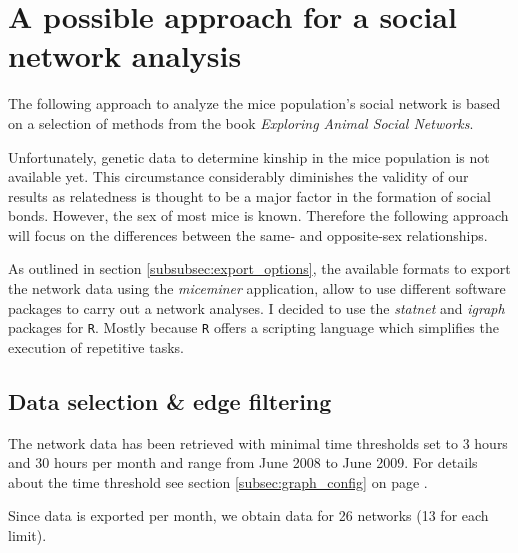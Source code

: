 \section{A possible approach for a social network analysis}
\label{sec:network_analysis}

The following approach to analyze the mice population's social network is based on a selection of methods from the book \textit{Exploring Animal Social Networks}\citep{croft:07}. 

Unfortunately, genetic data to determine kinship in the mice population is not available yet. This circumstance considerably diminishes the validity of our results as relatedness is thought to be a major factor in the formation of social bonds. However, the sex of most mice is known. Therefore the following approach will focus on the differences between the same- and opposite-sex relationships.

As outlined in section \ref{subsubsec:export_options}, the available formats to export the network data using the \textit{miceminer} application, allow to use different software packages to carry out a network analyses. I decided to use the \textit{statnet}\citep{statnet:03} and \textit{igraph}\citep{igraph:06} packages for \lstinline|R|\citep{r:05}. Mostly because \lstinline|R| offers a scripting language which simplifies the execution of repetitive tasks. 


\subsection{Data selection \& edge filtering}
\label{subsec:data_selection}


The network data has been retrieved with minimal time thresholds set to 3 hours and 30 hours per month and range from June 2008 to June 2009. For details about the time threshold see section \ref{subsec:graph_config} on page \pageref{subsec:graph_config}.

Since data is exported per month, we obtain data for 26 networks (13 for each limit).


